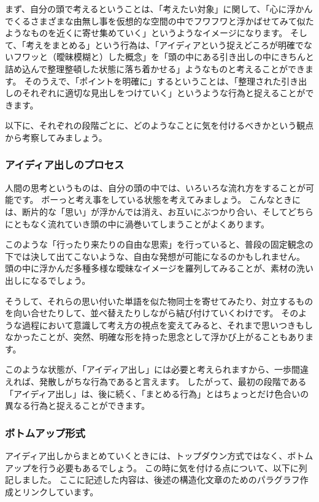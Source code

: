 \documentclass[12pt,a4paper]{jsarticle}
\begin{document}
まず、自分の頭で考えるということは、「考えたい対象」に関して、「心に浮かんでくるさまざまな由無し事を仮想的な空間の中でフワフワと浮かばせてみて似たようなものを近くに寄せ集めていく」というようなイメージになります。
そして、「考えをまとめる」という行為は、「アイディアという捉えどころが明確でないフワッと（曖昧模糊と）した概念」を「頭の中にある引き出しの中にきちんと詰め込んで整理整頓した状態に落ち着かせる」ようなものと考えることができます。
そのうえで、「ポイントを明確に」するということは、「整理された引き出しのそれぞれに適切な見出しをつけていく」というような行為と捉えることができます。

以下に、それぞれの段階ごとに、どのようなことに気を付けるべきかという観点から考察してみましょう。

\subsubsection{アイディア出しのプロセス}

人間の思考というものは、自分の頭の中では、いろいろな流れ方をすることが可能です。
ボーっと考え事をしている状態を考えてみましょう。
こんなときには、断片的な「思い」が浮かんでは消え、お互いにぶつかり合い、そしてどちらにともなく流れていき頭の中に渦巻いてしまうことがよくあります。

このような「行ったり来たりの自由な思索」を行っていると、普段の固定観念の下では決して出てこないような、自由な発想が可能になるのかもしれません。
頭の中に浮かんだ多種多様な曖昧なイメージを羅列してみることが、素材の洗い出しになるでしょう。

そうして、それらの思い付いた単語を似た物同士を寄せてみたり、対立するものを向い合せたりして、並べ替えたりしながら結び付けていくわけです。
そのような過程において意識して考え方の視点を変えてみると、それまで思いつきもしなかったことが、突然、明確な形を持った思念として浮かび上がることもあります。

このような状態が、「アイディア出し」には必要と考えられますから、一歩間違えれば、発散しがちな行為であると言えます。
したがって、最初の段階である「アイディア出し」は、後に続く、「まとめる行為」とはちょっとだけ色合いの異なる行為と捉えることができます。

\subsubsection{ボトムアップ形式}

アイディア出しからまとめていくときには、トップダウン方式ではなく、ボトムアップを行う必要もあるでしょう。
この時に気を付ける点について、以下に列記しました。
ここに記述した内容は、後述の構造化文章のためのパラグラフ作成とリンクしています。
\end{document}
